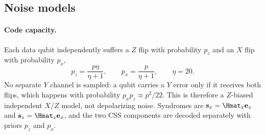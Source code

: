 \begin{table}[t]
\centering
\small
\caption{Bivariate bicycle codes studied in this work~\cite{Bravyi2024Memory}.
         $\Hmat_x=[\mathbf{A}\mid\mathbf{B}]$ and
         $\Hmat_z=[\mathbf{B}^\top\mid\mathbf{A}^\top]$ over
         $\F_2[x,y]/(x^\ell-1,\,y^m-1)$.}
\label{tab:codes}
\end{table}

\subsection{Noise models}\label{sec:noise}

\paragraph{Code capacity.} Each data qubit independently suffers a $Z$
flip with probability $p_z$ and an $X$ flip with probability $p_x$,
\begin{equation}
p_z = \frac{p\eta}{\eta+1}, \qquad p_x = \frac{p}{\eta+1},
\qquad \eta = 20 .
\label{eq:bias}
\end{equation}
No separate $Y$ channel is sampled: a qubit carries a $Y$ error only if it
receives both flips, which happens with probability
$p_xp_z\approx p^2/22$. This is therefore a $Z$-biased independent
$X$/$Z$ model, not depolarizing noise. Syndromes are
$\mathbf{s}_x=\Hmat_x\mathbf{e}_z$ and $\mathbf{s}_z=\Hmat_z\mathbf{e}_x$,
and the two CSS components are decoded separately with priors $p_z$ and
$p_x$.

